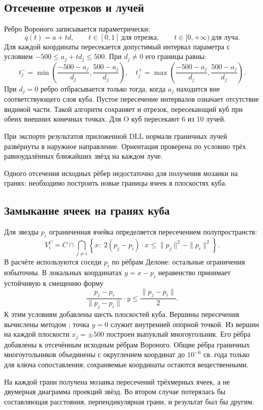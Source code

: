 \subsection{Отсечение отрезков и лучей}
Ребро Вороного записывается параметрически:
\[
 q(t)=a+td,
 \qquad t\in[0,1]\ \text{для отрезка},\qquad
 t\in[0,+\infty)\ \text{для луча}.
\]
Для каждой координаты пересекается допустимый интервал параметра с условием $-500\leq a_j+td_j\leq500$. При $d_j\neq0$ его границы равны:
\[
 t_j^- =\min\left(\frac{-500-a_j}{d_j},\frac{500-a_j}{d_j}\right),\quad
 t_j^+ =\max\left(\frac{-500-a_j}{d_j},\frac{500-a_j}{d_j}\right).
\]
При $d_j=0$ ребро отбрасывается только тогда, когда $a_j$ находится вне соответствующего слоя куба. Пустое пересечение интервалов означает отсутствие видимой части. Такой алгоритм сохраняет и отрезок, пересекающий куб при обеих внешних конечных точках. Для O куб пересекают 6 из 10 лучей.

При экспорте результатов приложенной DLL нормали граничных лучей развёрнуты в наружное направление. Ориентация проверена по условию трёх равноудалённых ближайших звёзд на каждом луче.

Одного отсечения исходных рёбер недостаточно для получения мозаики на гранях: необходимо построить новые границы ячеек в плоскостях куба.

\subsection{Замыкание ячеек на гранях куба}
Для звезды $p_i$ ограниченная ячейка определяется пересечением полупространств:
\[
 V_i^C=C\cap\bigcap_{j\neq i}
 \left\{x:\;2(p_j-p_i)\cdot x\leq
       \|p_j\|^2-\|p_i\|^2\right\}.
\]
В расчёте используются соседи $p_i$ по рёбрам Делоне: остальные ограничения избыточны. В локальных координатах $y=x-p_i$ неравенство принимает устойчивую к смещению форму
\[
 \frac{p_j-p_i}{\|p_j-p_i\|}\cdot y
 \leq\frac{\|p_j-p_i\|}{2}.
\]
К этим условиям добавлены шесть плоскостей куба. Вершины пересечения вычислены методом ; точка $y=0$ служит внутренней опорной точкой. Из вершин на каждой плоскости $x_j=\pm500$ построен выпуклый многоугольник. Его рёбра добавлены к отсечённым исходным рёбрам Вороного. Общие рёбра граничных многоугольников объединены с округлением координат до $10^{-6}$ св. года только для ключа сопоставления; сохраняемые координаты остаются вещественными.

На каждой грани получена мозаика пересечений трёхмерных ячеек, а не двумерная диаграмма проекций звёзд. Во втором случае потерялась бы составляющая расстояния, перпендикулярная грани, и результат был бы другим.

